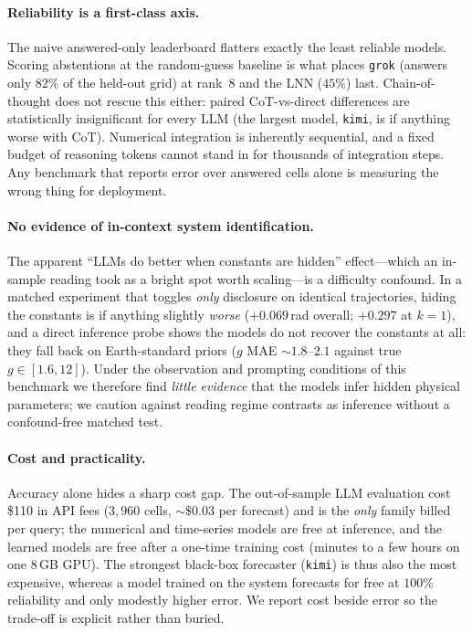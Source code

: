 \documentclass{article}
\begin{document}
\paragraph{Reliability is a first-class axis.} The naive answered-only leaderboard
flatters exactly the least reliable models. Scoring abstentions at the random-guess
baseline is what places \texttt{grok} (answers only $82\%$ of the held-out grid) at
rank~$8$ and the LNN ($45\%$) last. Chain-of-thought does not rescue this either:
paired CoT-vs-direct differences are statistically insignificant for every LLM (the
largest model, \texttt{kimi}, is if anything worse with CoT). Numerical integration is
inherently sequential, and a
fixed budget of reasoning tokens cannot stand in for thousands of integration steps.
Any benchmark that reports error over answered cells alone is measuring the wrong
thing for deployment.

\paragraph{No evidence of in-context system identification.} The apparent
``LLMs do better when constants are hidden'' effect---which an in-sample reading took
as a bright spot worth scaling---is a difficulty confound. In a matched experiment
that toggles \emph{only} disclosure on identical trajectories, hiding the constants is
if anything slightly \emph{worse} ($+0.069$\,rad overall; $+0.297$ at $k{=}1$), and a
direct inference probe shows the models do not recover the constants at all: they fall
back on Earth-standard priors ($g$ MAE ${\sim}1.8$--$2.1$ against true
$g\in[1.6,12]$). Under the observation and prompting conditions of this benchmark we therefore find
\emph{little evidence} that the models infer hidden physical parameters; we caution
against reading regime contrasts as inference without a confound-free matched test.

\paragraph{Cost and practicality.} Accuracy alone hides a sharp cost gap. The
out-of-sample LLM evaluation cost \$110 in API fees ($3{,}960$ cells,
${\sim}\$0.03$ per forecast) and is the \emph{only} family billed per query; the
numerical and time-series models are free at inference, and the learned models are free
after a one-time training cost (minutes to a few hours on one $8$\,GB GPU). The
strongest black-box forecaster (\texttt{kimi}) is thus also the most expensive, whereas a
model trained on the system forecasts for free at $100\%$ reliability and only modestly
higher error. We report cost beside error so the trade-off is explicit rather than
buried.
\end{document}
